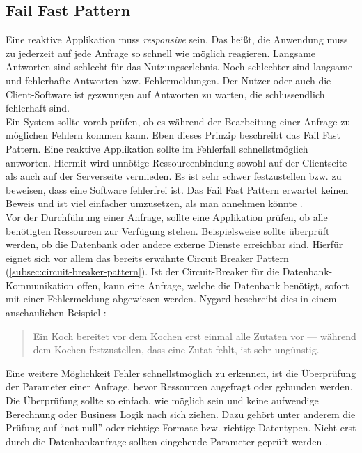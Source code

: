 \pagebreak

\subsection{Fail Fast Pattern}\label{subsec:fail-fast-pattern}
Eine reaktive Applikation muss \textit{responsive} sein. Das heißt, die Anwendung muss zu jederzeit auf jede Anfrage so schnell wie möglich reagieren. Langsame Antworten sind schlecht für das Nutzungserlebnis. Noch schlechter sind langsame und fehlerhafte Antworten bzw. Fehlermeldungen. Der Nutzer oder auch die Client-Software ist gezwungen auf Antworten zu warten, die schlussendlich fehlerhaft sind.\\
Ein System sollte vorab prüfen, ob es während der Bearbeitung einer Anfrage zu möglichen Fehlern kommen kann. Eben dieses Prinzip beschreibt das Fail Fast Pattern. Eine reaktive Applikation sollte im Fehlerfall schnellstmöglich antworten. Hiermit wird unnötige Ressourcenbindung sowohl auf der Clientseite als auch auf der Serverseite vermieden. Es ist sehr schwer festzustellen bzw. zu beweisen, dass eine Software fehlerfrei ist. Das Fail Fast Pattern erwartet keinen Beweis und ist viel einfacher umzusetzen, als man annehmen könnte \cite[S.~106~\&~S.~107]{nygard_release_2007}.\\
Vor der Durchführung einer Anfrage, sollte eine Applikation prüfen, ob alle benötigten Ressourcen zur Verfügung stehen. Beispielsweise sollte überprüft werden, ob die Datenbank oder andere externe Dienste erreichbar sind. Hierfür eignet sich vor allem das bereits erwähnte Circuit Breaker Pattern (\ref{subsec:circuit-breaker-pattern}). Ist der Circuit-Breaker für die Datenbank-Kommunikation offen, kann eine Anfrage, welche die Datenbank benötigt, sofort mit einer Fehlermeldung abgewiesen werden. Nygard beschreibt dies in einem anschaulichen Beispiel \cite[S.~106]{nygard_release_2007}:

\begin{quotation}
Ein Koch bereitet vor dem Kochen erst einmal alle Zutaten vor --- während dem Kochen festzustellen, dass eine Zutat fehlt, ist sehr ungünstig.
\end{quotation}

Eine weitere Möglichkeit Fehler schnellstmöglich zu erkennen, ist die Überprüfung der Parameter einer Anfrage, bevor Ressourcen angefragt oder gebunden werden. Die Überprüfung sollte so einfach, wie möglich sein und keine aufwendige Berechnung oder Business Logik nach sich ziehen. Dazu gehört unter anderem die Prüfung auf \enquote{not null} oder richtige Formate bzw. richtige Datentypen. Nicht erst durch die Datenbankanfrage sollten eingehende Parameter geprüft werden \cite[S.~107]{nygard_release_2007}.\\

